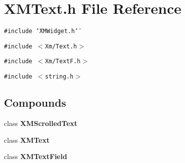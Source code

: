 \section{XMText.h File Reference}
\label{XMText_8h}
{\tt \#include \char`\"{}XMWidget.h\char`\"{}}\par
{\tt \#include $<$Xm/Text.h$>$}\par
{\tt \#include $<$Xm/Text\-F.h$>$}\par
{\tt \#include $<$string.h$>$}\par
\subsection*{Compounds}
\begin{CompactItemize}
\item 
class {\bf XMScrolled\-Text}
\item 
class {\bf XMText}
\item 
class {\bf XMText\-Field}
\end{CompactItemize}
